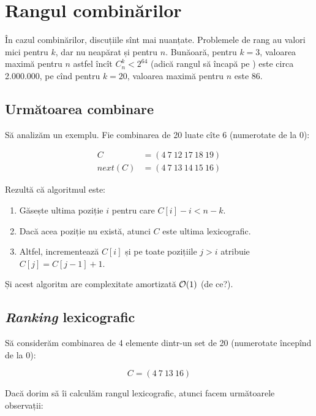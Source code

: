 \documentclass[../main.tex]{subfiles}
\begin{document}
\section{Rangul combinărilor}

În cazul combinărilor, discuțiile sînt mai nuanțate. Problemele de rang au valori mici pentru $k$, dar nu neapărat și pentru $n$. Bunăoară, pentru $k = 3$, valoarea maximă pentru $n$ astfel încît $C_{n}^{k} < 2^{64}$ (adică rangul să încapă pe ) este circa 2.000.000, pe cînd pentru $k = 20$, valoarea maximă pentru $n$ este 86.

\subsection{Următoarea combinare}

Să analizăm un exemplu. Fie combinarea de 20 luate cîte 6 (numerotate de la 0):

\begin{align*}
C &= (4\ 7\ 12\ 17\ 18\ 19) \\
next(C) &= (4\ 7\ 13\ 14\ 15\ 16)
\end{align*}

Rezultă că algoritmul este:

\begin{enumerate}
  \item Găsește ultima poziție $i$ pentru care $C[i] - i < n - k$.

  \item Dacă acea poziție nu există, atunci $C$ este ultima lexicografic.

  \item Altfel, incrementează $C[i]$ și pe toate pozițiile $j > i$ atribuie $C[j] = C[j - 1] + 1$.
\end{enumerate}

Și acest algoritm are complexitate amortizată $\mathcal{O}(1)$ (de ce?).

\subsection{\textit{Ranking} lexicografic}

Să considerăm combinarea de 4 elemente dintr-un set de 20 (numerotate începînd de la 0):

$$C = (4\ 7\ 13\ 16)$$

Dacă dorim să îi calculăm rangul lexicografic, atunci facem următoarele observații:
\end{document}
